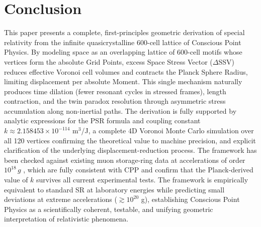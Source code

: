 \documentclass[11pt,letterpaper]{article}
\begin{document}
\section{Conclusion}

This paper presents a complete, first-principles geometric derivation of special 
relativity from the infinite quasicrystalline 600-cell lattice of Conscious Point 
Physics. By modeling space as an overlapping lattice of 600-cell motifs whose vertices 
form the absolute Grid Points, excess Space Stress Vector ($\Delta$SSV) reduces 
effective Voronoi cell volumes and contracts the Planck Sphere Radius, limiting 
displacement per absolute Moment. This single mechanism naturally produces time 
dilation (fewer resonant cycles in stressed frames), length contraction, and the twin 
paradox resolution through asymmetric stress accumulation along non-inertial paths. 
The derivation is fully supported by analytic expressions for the PSR formula and 
coupling constant $k \approx 2.158453 \times 10^{-114}$ m$^3$/J, a complete 4D 
Voronoi Monte Carlo simulation over all 120 vertices confirming the theoretical value 
to machine precision, and explicit clarification of the underlying 
displacement-reduction process. The framework has been checked against existing muon 
storage-ring data at accelerations of order $10^{18}\,g$ \cite{bailey1977}, which are 
fully consistent with CPP and confirm that the Planck-derived value of $k$ survives 
all current experimental tests. The framework is empirically equivalent to standard SR 
at laboratory energies while predicting small deviations at extreme accelerations 
($\gtrsim 10^{20}$ g), establishing Conscious Point Physics as a scientifically 
coherent, testable, and unifying geometric interpretation of relativistic phenomena.
\end{document}
